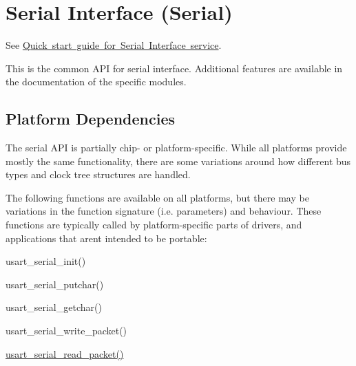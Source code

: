 \hypertarget{group__serial__group}{}\section{Serial Interface (Serial)}
\label{group__serial__group}
See \mbox{\hyperlink{serial_quickstart}{Quick start guide for Serial Interface service}}.

This is the common A\+PI for serial interface. Additional features are available in the documentation of the specific modules.\hypertarget{group__serial__group_serial_group_platform}{}\subsection{Platform Dependencies}\label{group__serial__group_serial_group_platform}
The serial A\+PI is partially chip-\/ or platform-\/specific. While all platforms provide mostly the same functionality, there are some variations around how different bus types and clock tree structures are handled.

The following functions are available on all platforms, but there may be variations in the function signature (i.\+e. parameters) and behaviour. These functions are typically called by platform-\/specific parts of drivers, and applications that aren\textquotesingle{}t intended to be portable\+:
\begin{DoxyItemize}
\item usart\+\_\+serial\+\_\+init()
\item usart\+\_\+serial\+\_\+putchar()
\item usart\+\_\+serial\+\_\+getchar()
\item usart\+\_\+serial\+\_\+write\+\_\+packet()
\item \mbox{\hyperlink{sio2host_8c_a194782242a6290224262d0c16e23e750}{usart\+\_\+serial\+\_\+read\+\_\+packet()}} 
\end{DoxyItemize}